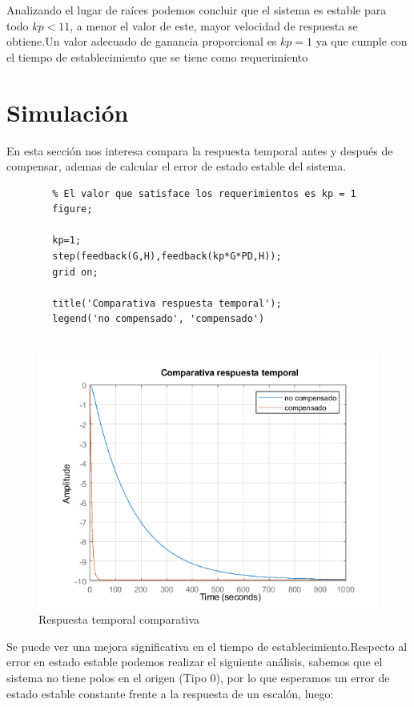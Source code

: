 \documentclass[12pt]{article}
\begin{document}
	Analizando el lugar de raíces podemos concluir que el sistema es estable para todo $kp<11$, a menor el valor de este, mayor velocidad de respuesta se obtiene.Un valor adecuado de ganancia proporcional es $kp=1$ ya que cumple con el tiempo de establecimiento que se tiene como requerimiento

\section{Simulación}
	En esta sección nos interesa compara la respuesta temporal antes y después de compensar, ademas de calcular el error de estado estable del sistema.
	
	\begin{lstlisting}
		% El valor que satisface los requerimientos es kp = 1
		figure;
		
		kp=1;
		step(feedback(G,H),feedback(kp*G*PD,H));
		grid on;
		
		title('Comparativa respuesta temporal');
		legend('no compensado', 'compensado')
		
	\end{lstlisting}\newpage
	
	\begin{figure}[h!]
		\centering
		\includegraphics[width=1\linewidth]{Imagenes/Respuesta_temporal_comparativa}
		\caption[Respuesta temporal comparativa]{Respuesta temporal comparativa}
		\label{fig:respuestatemporalcomparativa}
	\end{figure}
	
	Se puede ver una mejora significativa en el tiempo de establecimiento.Respecto al error en estado estable podemos realizar el siguiente análisis, sabemos que el sistema no tiene polos en el origen (Tipo 0), por lo que esperamos un error de estado estable constante frente a la respuesta de un escalón, luego:
	
\end{document}
